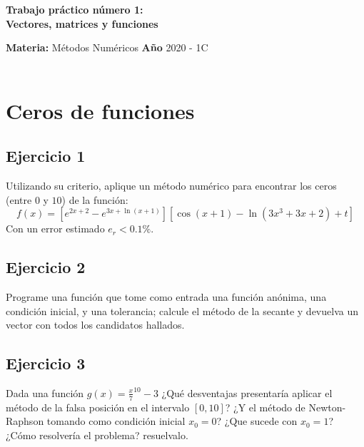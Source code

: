\documentclass[a4paper, 11pt]{article}
\begin{document}
\renewcommand{\listtablename}{Índice de tablas} 
\renewcommand{\tablename}{Tabla}
\begin{center}
\LARGE \bf Trabajo práctico número 1: \\ Vectores, matrices y funciones
\end{center}

\vspace{1cm} 
\noindent\textbf{Materia:} M\'etodos Num\'ericos \hfill
\textbf{Año} 2020 - 1C \\
\hfill \\
\section*{Ceros de funciones}

\subsection*{Ejercicio 1}
Utilizando su criterio, aplique un método numérico para encontrar los ceros (entre $0$ y $10$) de la función:
$$f(x) = \left[ e^{2x+2} - e^{3x+\ln(x+1)}\right]\left[ \cos(x+1) - \ln(3x^3 +3x+2)+ t\right] $$
Con un error estimado $e_r <0.1\%$.

\subsection*{Ejercicio 2}
Programe una función que tome como entrada una función anónima, una condición inicial, y una tolerancia; calcule el método de la secante y devuelva un vector con todos los candidatos hallados. 

\subsection*{Ejercicio 3}
Dada una función $g(x) = \frac{x}{7}^{10} -3$ ¿Qué desventajas presentaría aplicar el método de la falsa posición en el intervalo $[0,10]$? ¿Y el método de Newton-Raphson tomando como condición inicial $x_0 = 0$? ¿Que sucede con $x_0 =1$? ¿Cómo resolvería el problema? resuelvalo.
\end{document}

